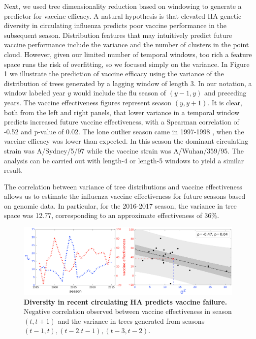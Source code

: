 \documentclass[a4paper,11pt]{article}
\begin{document}
Next, we used tree dimensionality reduction based on
windowing to generate a predictor for vaccine efficacy.
A natural hypothesis is that elevated HA genetic diversity in
circulating influenza predicts poor vaccine performance in the
subsequent season.  Distribution
features that may intuitively predict future vaccine performance
include the variance and the number of clusters in the point cloud.
However, given our limited number of temporal windows, too rich a
feature space runs the risk of overfitting, so we focused simply on
the variance.  In Figure \ref{fig:flu_VE} we illustrate the prediction
of vaccine efficacy using the variance of the distribution of trees
generated by a lagging window of length 3. 
In our notation, a window labeled year $y$ would include the flu
season of $(y-1, y)$ and preceding years.  The vaccine effectiveness
figures represent season $(y, y+1).$ It is clear, both from the left
and right panels, that lower variance in a temporal window predicts
increased future vaccine effectiveness, with a Spearman correlation of
-0.52 and p-value of 0.02. The lone outlier season came in 1997-1998
\cite{gupta2006quantifying}, when the vaccine efficacy was lower than
expected. In this season the dominant circulating strain was
A/Sydney/5/97 while the vaccine strain was A/Wuhan/359/95.  The
analysis can be carried out with length-4 or length-5 windows to yield
a similar result.

The correlation between variance of tree distributions and vaccine
effectiveness allows us to estimate the influenza vaccine
effectiveness for future seasons based on genomic data. In particular,
for the 2016-2017 season, the variance in tree space was 12.77,
corresponding to an approximate effectiveness of 36\%.  

\begin{figure}
    \centering
    \includegraphics[width=\linewidth]{../figures/influenza_VE.png}
    \caption{{\bf Diversity in recent circulating HA predicts vaccine failure.} Negative correlation observed between vaccine effectiveness in season $(t, t+1)$ and the variance in trees generated from seasons $(t-1,t), (t-2. t-1), (t-3,t-2)$.}
    \label{fig:flu_VE}
\end{figure} 
\end{document}
